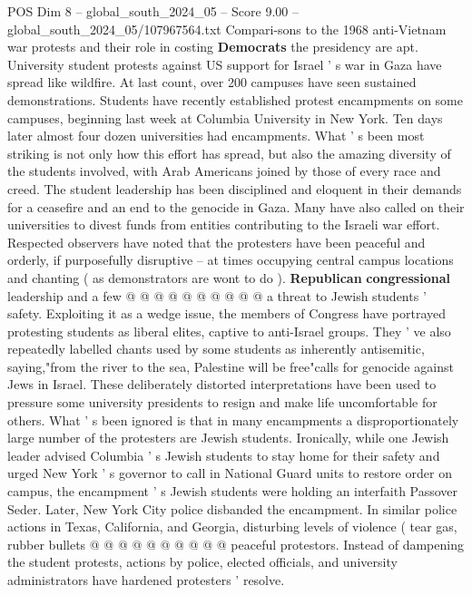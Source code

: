 \begin{textsample}{POS Dim 8 – global\_south\_2024\_05 – Score 9.00 – global\_south\_2024\_05/107967564.txt}  \label{ex:f8_pos_219}
Compari-sons to the 1968 anti-Vietnam war protests and their role in costing \textbf{Democrats} the presidency are apt.
University student protests against US support for Israel ' s war in Gaza have spread like wildfire.
At last count, over 200 campuses have seen sustained demonstrations.
Students have recently established protest encampments on some campuses, beginning last week at Columbia University in New York.
Ten days later almost four dozen universities had encampments.
What ' s been most striking is not only how this effort has spread, but also the amazing diversity of the students involved, with Arab Americans joined by those of every race and creed.
The student leadership has been disciplined and eloquent in their demands for a ceasefire and an end to the genocide in Gaza.
Many have also called on their universities to divest funds from entities contributing to the Israeli war effort.
Respected observers have noted that the protesters have been peaceful and orderly, if purposefully disruptive -- at times occupying central campus locations and chanting ( as demonstrators are wont to do ). \textbf{Republican} \textbf{congressional} leadership and a few @ @ @ @ @ @ @ @ @ @ a threat to Jewish students ' safety.
Exploiting it as a wedge issue, the members of Congress have portrayed protesting students as liberal elites, captive to anti-Israel groups.
They ' ve also repeatedly labelled chants used by some students as inherently antisemitic, saying,"from the river to the sea, Palestine will be free"calls for genocide against Jews in Israel.
These deliberately distorted interpretations have been used to pressure some university presidents to resign and make life uncomfortable for others.
What ' s been ignored is that in many encampments a disproportionately large number of the protesters are Jewish students.
Ironically, while one Jewish leader advised Columbia ' s Jewish students to stay home for their safety and urged New York ' s governor to call in National Guard units to restore order on campus, the encampment ' s Jewish students were holding an interfaith Passover Seder.
Later, New York City police disbanded the encampment.
In similar police actions in Texas, California, and Georgia, disturbing levels of violence ( tear gas, rubber bullets @ @ @ @ @ @ @ @ @ @ peaceful protestors.
Instead of dampening the student protests, actions by police, elected officials, and university administrators have hardened protesters ' resolve.

\end{textsample}
